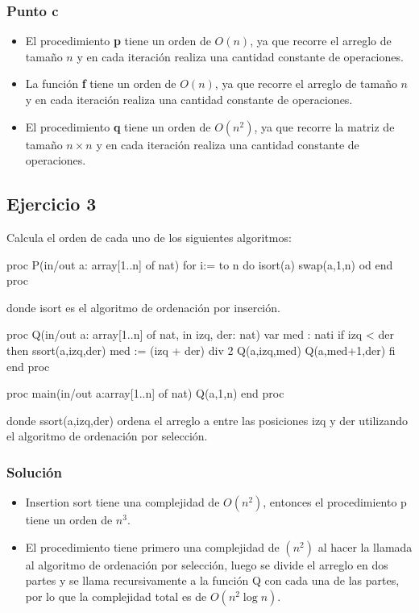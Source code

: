 \subsubsection{Punto c}
\begin{itemize}
    \item El procedimiento \textbf{p} tiene un orden de $O(n)$, ya que recorre el arreglo de tamaño $n$ y en cada iteración realiza una cantidad constante de operaciones.
    \item La función \textbf{f} tiene un orden de $O(n)$, ya que recorre el arreglo de tamaño $n$ y en cada iteración realiza una cantidad constante de operaciones.
    \item El procedimiento \textbf{q} tiene un orden de $O(n^2)$, ya que recorre la matriz de tamaño $n \times n$ y en cada iteración realiza una cantidad constante de operaciones.
\end{itemize}

\newpage
\subsection{Ejercicio 3}
Calcula el orden de cada uno de los siguientes algoritmos:
\begin{codebox}
\begin{pascallike}
proc P(in/out a: array[1..n] of nat)
    for i:= to n do
        isort(a)
        swap(a,1,n)
    od
end proc
\end{pascallike}
\end{codebox}
donde isort es el algoritmo de ordenación por inserción.

\begin{codebox}
\begin{pascallike}
proc Q(in/out a: array[1..n] of nat, in izq, der: nat)
    var med : nati
    if izq < der then
        ssort(a,izq,der)
        med := (izq + der) div 2
        Q(a,izq,med)
        Q(a,med+1,der)
    fi
end proc

proc main(in/out a:array[1..n] of nat)
    Q(a,1,n)
end proc
\end{pascallike}
\end{codebox}
donde ssort(a,izq,der) ordena el arreglo a entre las posiciones izq y der utilizando el algoritmo de ordenación por selección.

\subsubsection{Solución}
\begin{itemize}
    \item Insertion sort tiene una complejidad de $O(n^2)$, entonces el procedimiento p tiene un orden de $n^3$.
    \item El procedimiento tiene primero una complejidad de $(n^2)$ al hacer la llamada al algoritmo de ordenación por selección, luego se divide el arreglo en dos partes y se llama recursivamente a la función Q con cada una de las partes, por lo que la complejidad total es de $O(n^2 \log n)$.
\end{itemize}

